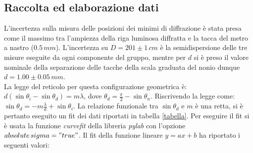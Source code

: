 \documentclass[10pt,a4paper]{article}
\begin{document}
\subsection{Raccolta ed elaborazione dati}
L'incertezza sulla misura delle posizioni dei minimi di diffrazione è stata presa come il massimo tra l'ampiezza della riga luminosa diffratta e la tacca del metro a nastro ($0.5 \,mm$). L'incertezza su $D = 201 \pm 1 \, cm$ è la semidispersione delle tre misure eseguite da ogni componente del gruppo, mentre per $d$ si è preso il valore nominale della separazione delle tacche della scala graduata del nonio dunque $d = 1.00 \pm 0.05 \, mm$.\\
La legge del reticolo per questa configurazione geometrica è: $d(\sin  \theta_i - \sin \theta_d)  = m \lambda $, dove $\theta_d = \frac{\pi}{2} - \sin \theta_n $. Riscrivendo la legge come: $\sin \theta_d = -m \frac{\lambda}{d} + \sin \theta_i$. La relazione funzionale tra $\sin  \theta_d$ e $m$ è una retta, si è pertanto eseguito un fit dei dati riportati in tabella \ref{tabella}. Per eseguire il fit si è usata la funzione \emph{curvefit} della libreria \emph{pylab} con l'opzione \emph{$absolute\,sigma = "true"$}. Il fit della funzione lineare $y = ax+b$ ha riportato i seguenti valori: \\
\end{document}
